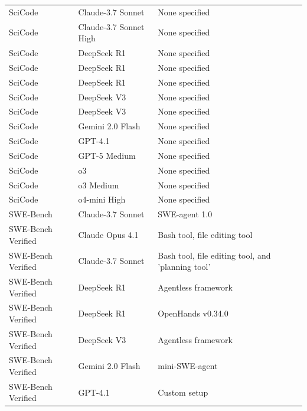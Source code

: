 \begin{longtable}{p{2cm}p{3cm}p{5cm}p{3cm}}
  SciCode & Claude-3.7 Sonnet & None specified & \cite{noauthor_artificial_2025} \\
  SciCode & Claude-3.7 Sonnet High & None specified & \cite{noauthor_artificial_2025} \\
  SciCode & DeepSeek R1 & None specified & \cite{noauthor_artificial_2025} \\
  SciCode & DeepSeek R1 & None specified & \cite{glm-45_team_glm-45_2025} \\
  SciCode & DeepSeek R1 & None specified & \cite{tian_scicode_2024} \\
  SciCode & DeepSeek V3 & None specified & \cite{noauthor_artificial_2025} \\
  SciCode & DeepSeek V3 & None specified & \cite{tian_scicode_2024} \\
  SciCode & Gemini 2.0 Flash & None specified & \cite{noauthor_artificial_2025} \\
  SciCode & GPT-4.1 & None specified & \cite{noauthor_artificial_2025} \\
  SciCode & GPT-5 Medium & None specified & \cite{noauthor_artificial_2025} \\
  SciCode & o3 & None specified & \cite{glm-45_team_glm-45_2025} \\
  SciCode & o3 Medium & None specified & \cite{noauthor_artificial_2025} \\
  SciCode & o4-mini High & None specified & \cite{noauthor_artificial_2025} \\
  SWE-Bench & Claude-3.7 Sonnet & SWE-agent 1.0 & \cite{jimenez_swe-bench_2023} \\
  SWE-Bench Verified & Claude Opus 4.1 & Bash tool, file editing tool & \cite{noauthor_claude_2025-1} \\
  SWE-Bench Verified & Claude-3.7 Sonnet & Bash tool, file editing tool, and 'planning tool' & \cite{noauthor_claude_2025} \\
  SWE-Bench Verified & DeepSeek R1 & Agentless framework & \cite{deepseek-ai_deepseek-r1_2025,xia_agentless_2024} \\
  SWE-Bench Verified & DeepSeek R1 & OpenHands v0.34.0 & \cite{glm-45_team_glm-45_2025,wang_openhands_2025} \\
  SWE-Bench Verified & DeepSeek V3 & Agentless framework & \cite{deepseek-ai_deepseek-v3_2024,xia_agentless_2024} \\
  SWE-Bench Verified & Gemini 2.0 Flash & mini-SWE-agent & \cite{jimenez_swe-bench_2023,chowdhury_neil_introducing_2024} \\
  SWE-Bench Verified & GPT-4.1 & Custom setup & \cite{noauthor_introducing_2025,noah_maccallum_gpt-41_2025} \\

\end{longtable}
